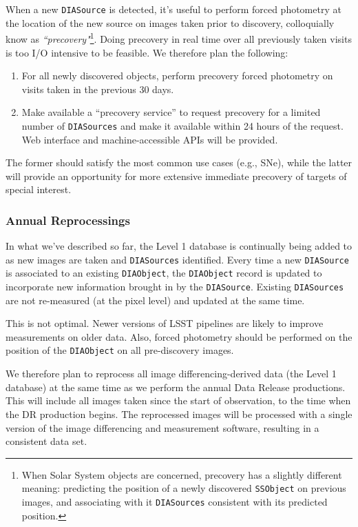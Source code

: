 \documentclass[12pt]{article}
\newcommand{\code}[1]{\texttt{#1}}
\newcommand{\DIASource}{\code{DIASource}\xspace}
\newcommand{\DIASources}{\code{DIASources}\xspace}
\newcommand{\DIAObject}{\code{DIAObject}\xspace}
\newcommand{\DB}{{Level 1 database}\xspace}
\newcommand{\SSObject}{\code{SSObject}\xspace}
\begin{document}
When a new \DIASource is detected, it's useful to perform forced photometry at the location of the new source on images taken prior to discovery, colloquially know as {\em ``precovery"}\footnote{When Solar System objects are concerned, precovery has a slightly different meaning: predicting the position of a newly discovered \SSObject on previous images, and associating with it \DIASources consistent with its predicted position.}. Doing precovery in real time over all previously taken visits is too I/O intensive to be feasible. We therefore plan the following:
\begin{enumerate}
\item For all newly discovered objects, perform precovery forced photometry on visits taken in the previous 30 days.
\item Make available a ``precovery service'' to request precovery for a limited number of \DIASources and make it available within 24 hours of the request. Web interface and machine-accessible APIs will be provided.
\end{enumerate}

The former should satisfy the most common use cases (e.g., SNe), while the latter will provide an opportunity for more extensive immediate precovery of targets of special interest.

\subsubsection{Annual Reprocessings}
\label{sec:l1dbreproc}

In what we've described so far, the \DB is continually being added to as new images are taken and \DIASources identified. Every time a new \DIASource is associated to an existing \DIAObject, the \DIAObject record is updated to incorporate new information brought in by the \DIASource. Existing \DIASources are not re-measured (at the pixel level) and updated at the same time.

This is not optimal. Newer versions of LSST pipelines are likely to improve measurements on older data. Also, forced photometry should be performed on the position of the \DIAObject on all pre-discovery images.

We therefore plan to reprocess all image differencing-derived data (the \DB) at the same time as we perform the annual Data Release productions. This will include all images taken since the start of observation, to the time when the DR production begins. The reprocessed images will be processed with a single version of the image differencing and measurement software, resulting in a consistent data set.
\end{document}

